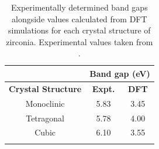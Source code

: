 \begin{table}[htp] %
\onehalfspacing
\centering
\caption[Experimentally determined band gaps alongside values calculated from DFT simulations for each crystal structure of zirconia.]{Experimentally determined band gaps alongside values calculated from DFT simulations for each crystal structure of zirconia. Experimental values taken from \cite{French1994}.}
\begin{tabular}{ccc}
{\bf }                                       & \multicolumn{2}{c}{{\bf Band gap (eV)}}      \\ \hline
\multicolumn{1}{c}{{\bf Crystal Structure}} & \multicolumn{1}{c}{{\bf Expt.}} & {\bf DFT} \\ \hline
\multicolumn{1}{c}{Monoclinic}              & \multicolumn{1}{c}{5.83}        & 3.45      \\
\multicolumn{1}{c}{Tetragonal}              & \multicolumn{1}{c}{5.78}        & 4.00      \\
\multicolumn{1}{c}{Cubic}                   & \multicolumn{1}{c}{6.10}         &   3.55 \\ \hline
\label{table:bandgap}
\end{tabular}
\end{table}


